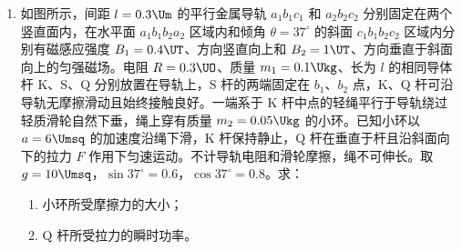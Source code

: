 \documentclass[\gkver]{gaokaozhenti}
\begin{document}
\begin{enumerate}
\item
如图所示，间距 $l=0.3\Um$ 的平行金属导轨 $a_{1}b_{1}c_{1}$ 和 $a_{2}b_{2}c_{2}$ 分别固定在两个竖直面内，在水平面 $a_{1}b_{1}b_{2}a_{2}$ 区域内和倾角 $\theta=37^{\circ}$ 的斜面 $c_{1}b_{1}b_{2}c_{2}$ 区域内分别有磁感应强度 $B_{1}=0.4\UT$、方向竖直向上和 $B_{2}=1\UT$、方向垂直于斜面向上的匀强磁场。电阻 $R=0.3\UO$、质量 $m_{1}=0.1\Ukg$、长为 $l$ 的相同导体杆 K、S、Q 分别放置在导轨上，S 杆的两端固定在 $b_{1}$、$b_{2}$ 点，K、Q 杆可沿导轨无摩擦滑动且始终接触良好。一端系于 K 杆中点的轻绳平行于导轨绕过轻质滑轮自然下垂，绳上穿有质量 $m_{2}=0.05\Ukg$ 的小环。已知小环以 $a=6\Umsq$ 的加速度沿绳下滑，K 杆保持静止，Q 杆在垂直于杆且沿斜面向下的拉力 $F$ 作用下匀速运动。不计导轨电阻和滑轮摩擦，绳不可伸长。取 $g=10\Umsq$，$\sin37^{\circ}=0.6$，$\cos37^{\circ}=0.8$。求：
\begin{enumerate}
	\item
	小环所受摩擦力的大小；
	\item
	Q 杆所受拉力的瞬时功率。
\end{enumerate}

\jdanswer{
\begin{enumerate}
	\item
	$0.2\UN$

	\item
	$2\UW$
\end{enumerate}
}


\end{enumerate}
\end{document}
